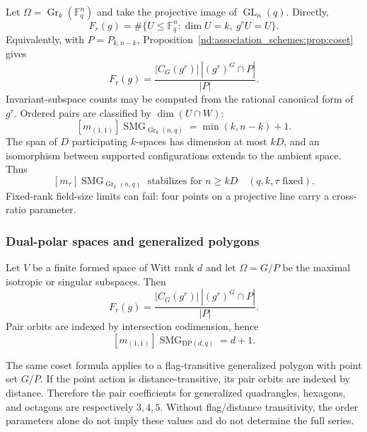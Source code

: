 \documentclass[10pt]{article}
\newcommand{\SMG}{\operatorname{SMG}}
\newcommand{\MGF}{\SMG}
\newcommand{\F}{\mathbb F}
\newcommand{\GL}{\operatorname{GL}}
\newcommand{\Gr}{\operatorname{Gr}}
\begin{document}
Let $\Omega=\Gr_k(\F_q^n)$ and take the projective image of $\GL_n(q)$.  Directly,
\begin{equation}\label{nd:association_schemes:eq:grass-fixed}
 F_r(g)=\#\{U\leq\F_q^n:\dim U=k,\ g^rU=U\}.
\end{equation}
Equivalently, with $P=P_{k,n-k}$, Proposition~\ref{nd:association_schemes:prop:coset} gives
\[
 F_r(g)=\frac{|C_G(g^r)|\,|(g^r)^G\cap P|}{|P|}.
\]
Invariant-subspace counts may be computed from the rational canonical form
of $g^r$.  Ordered pairs are classified by $\dim(U\cap W)$:
\begin{equation}\label{nd:association_schemes:eq:grass-pair}
 \boxed{[m_{(1,1)}]\MGF_{\Gr_k(n,q)}=\min(k,n-k)+1.}
\end{equation}
The span of $D$ participating $k$-spaces has dimension at most $kD$, and an
isomorphism between supported configurations extends to the ambient space.
Thus
\begin{equation}\label{nd:association_schemes:eq:grass-stable}
 [m_\tau]\MGF_{\Gr_k(n,q)}\text{ stabilizes for }n\geq kD
 \quad(q,k,\tau\text{ fixed}).
\end{equation}
Fixed-rank field-size limits can fail: four points on a projective line carry
a cross-ratio parameter.

\subsubsection{Dual-polar spaces and generalized polygons}

Let $V$ be a finite formed space of Witt rank $d$ and let $\Omega=G/P$ be the
maximal isotropic or singular subspaces.  Then
\begin{equation}\label{nd:association_schemes:eq:dualpolar-fixed}
 F_r(g)=\frac{|C_G(g^r)|\,|(g^r)^G\cap P|}{|P|}.
\end{equation}
Pair orbits are indexed by intersection codimension, hence
\begin{equation}\label{nd:association_schemes:eq:dualpolar-pair}
 \boxed{[m_{(1,1)}]\MGF_{\mathrm{DP}(d,q)}=d+1.}
\end{equation}

The same coset formula applies to a flag-transitive generalized polygon with
point set $G/P$.  If the point action is distance-transitive, its pair orbits
are indexed by distance.  Therefore the pair coefficients for generalized
quadrangles, hexagons, and octagons are respectively $3,4,5$.  Without
flag/distance transitivity, the order parameters alone do not imply these
values and do not determine the full series.
\end{document}
